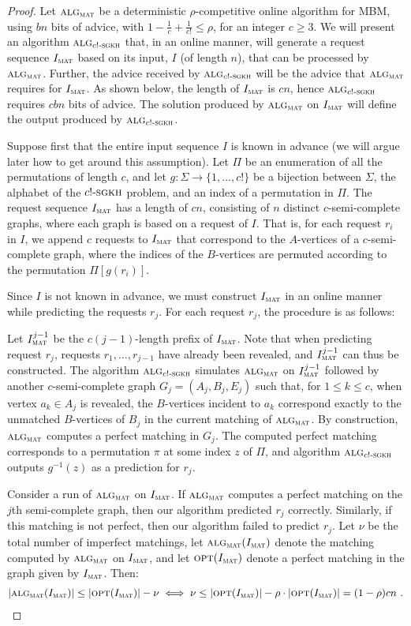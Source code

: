 \documentclass[a4paper]{article}
\newcommand{\OPT}{\textsc{opt}}
\newcommand{\opt}{\OPT}
\newcommand{\ALG}{\textsc{alg}}
\newcommand{\alg}{\ALG}
\newcommand{\cStr}{{c!\text{-}\textsc{sgkh}}}
\newcommand{\mat}{\textsc{mat}}
\begin{document}
\begin{proof}
  Let $\alg_\mat$ be a deterministic $\rho$-competitive online algorithm for \textsc{MBM},
  using $bn$ bits of advice, with $1 - \frac{1}{c} + \frac{1}{c!} \le \rho$, for an
  integer $c \ge 3$. We will present an algorithm $\alg_\cStr$ that, in an online manner,
  will generate a request sequence $I_\mat$ based on its input, $I$ (of length $n$), that can be processed
  by $\alg_\mat$. Further, the advice received by $\alg_\cStr$ will be the advice that
  $\alg_\mat$ requires for $I_\mat$. As shown below, the length of $I_\mat$ is $cn$, hence
  $\alg_\cStr$ requires $cbn$ bits of advice. The solution produced by $\alg_\mat$ on
  $I_\mat$ will define the output produced by $\alg_\cStr$.

  Suppose first that the entire input sequence $I$ is known in advance (we will argue later how to get around
  this assumption). Let $\Pi$ be an enumeration of all the permutations of length $c$,
and let $g:\Sigma \to \{1,\ldots,c!\}$ be a bijection between $\Sigma$, the alphabet of the $\cStr$ problem,
and an index of a permutation in $\Pi$. The request sequence $I_\mat$ has a length of $cn$,
consisting of $n$ distinct $c$-semi-complete graphs, where each graph is based on a request of $I$.
That is, for each request $r_i$ in $I$, we append $c$ requests to $I_\mat$ that correspond to
the $A$-vertices of a $c$-semi-complete graph, where the indices of the $B$-vertices
are permuted according to the permutation $\Pi[g(r_i)]$.


Since $I$ is not known in advance,
we must construct $I_\mat$ in an online manner while predicting the requests $r_j$. For each
request $r_j$, the procedure is as follows:

Let $I^{j-1}_\mat$ be the $c(j-1)$-length prefix of $I_\mat$. Note that when predicting
request $r_j$, requests $r_1,\ldots,r_{j-1}$ have already been revealed, and
$I^{j-1}_\mat$ can thus be constructed.
The algorithm $\alg_\cStr$ simulates $\alg_\mat$ on $I^{j-1}_\mat$ followed by
another $c$-semi-complete graph $G_j = (A_j,B_j,E_j)$ such that, for $1 \le k \le c$,
when vertex $a_k \in A_j$ is revealed, the $B$-vertices incident to $a_k$ correspond exactly
to the unmatched $B$-vertices of $B_j$ in the current matching of $\alg_\mat$. By construction,
$\alg_\mat$ computes a perfect matching in $G_j$.
The computed perfect matching corresponds to a permutation $\pi$ at some index $z$ of $\Pi$, and algorithm
$\alg_\cStr$ outputs $g^{-1}(z)$ as a prediction for $r_j$.

Consider a run of $\alg_\mat$ on $I_\mat$. If $\alg_\mat$ computes
a perfect matching on the $j$th semi-complete graph, then our algorithm predicted $r_j$ correctly.
Similarly, if this matching is not perfect, then
our algorithm failed to predict $r_j$. Let $\nu$ be the total number of imperfect matchings,
let $\alg_\mat(I_\mat)$ denote the matching computed by $\alg_\mat$ on $I_\mat$, and let
$\opt(I_\mat)$ denote a perfect matching in the graph given by $I_\mat$. Then:
\begin{align*}
  |\alg_\mat(I_\mat)| \le |\opt(I_\mat)| - \nu \iff \nu \le |\opt(I_\mat)| - \rho\cdot|\opt(I_\mat)| = (1-\rho)cn ~.
\end{align*}
\end{proof}
\end{document}

